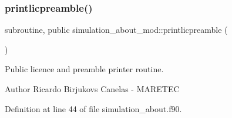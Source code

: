 \subsubsection{\texorpdfstring{printlicpreamble()}{printlicpreamble()}}
{\footnotesize\ttfamily subroutine, public simulation\+\_\+about\+\_\+mod\+::printlicpreamble (\begin{DoxyParamCaption}{ }\end{DoxyParamCaption})}



Public licence and preamble printer routine. 

\begin{DoxyAuthor}{Author}
Ricardo Birjukovs Canelas -\/ M\+A\+R\+E\+T\+EC 
\end{DoxyAuthor}


Definition at line 44 of file simulation\+\_\+about.\+f90.


